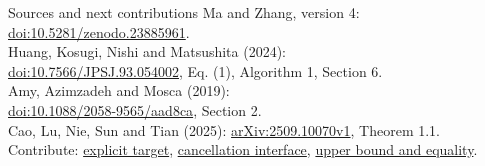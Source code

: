 \documentclass{beamer}
\begin{document}
\begin{frame}{Sources and next contributions}
\small
Ma and Zhang, version 4: \href{https://doi.org/10.5281/zenodo.23885961}{doi:10.5281/zenodo.23885961}.\\[.5em]
Huang, Kosugi, Nishi and Matsushita (2024):\\
\href{https://doi.org/10.7566/JPSJ.93.054002}{doi:10.7566/JPSJ.93.054002}, Eq. (1), Algorithm 1, Section 6.\\[.5em]
Amy, Azimzadeh and Mosca (2019):\\
\href{https://doi.org/10.1088/2058-9565/aad8ca}{doi:10.1088/2058-9565/aad8ca}, Section 2.\\[.5em]
Cao, Lu, Nie, Sun and Tian (2025): \href{https://arxiv.org/abs/2509.10070v1}{arXiv:2509.10070v1}, Theorem 1.1.\\[.5em]
Contribute: \href{https://github.com/the-omega-institute/trureturing-requests/issues/229}{explicit target}, \href{https://github.com/the-omega-institute/trureturing-requests/issues/230}{cancellation interface}, \href{https://github.com/the-omega-institute/trureturing-requests/issues/231}{upper bound and equality}.
\end{frame}
\FormalVerification
\end{document}
